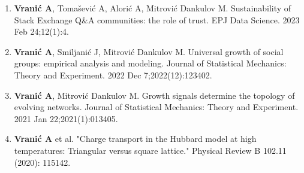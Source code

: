 \begin{enumerate}
	\item \textbf{Vranić A}, Tomašević A, Alorić A, Mitrović Dankulov M. Sustainability of Stack Exchange Q$\&$A communities: the role of trust. EPJ Data Science. 2023 Feb 24;12(1):4.
	
	
	\item \textbf{Vranić A}, Smiljanić J, Mitrović Dankulov M. Universal growth of social groups: empirical analysis and modeling. Journal of Statistical Mechanics: Theory and Experiment. 2022 Dec 7;2022(12):123402.
	
	\item \textbf{Vranić A}, Mitrović Dankulov M. Growth signals determine the topology of evolving networks. Journal of Statistical Mechanics: Theory and Experiment. 2021 Jan 22;2021(1):013405.

	\item \textbf{Vranić A}  et al. "Charge transport in the Hubbard model at high temperatures: Triangular versus square lattice." Physical Review B 102.11 (2020): 115142.
\end{enumerate}

\let\cleardoublepage\clearpage


